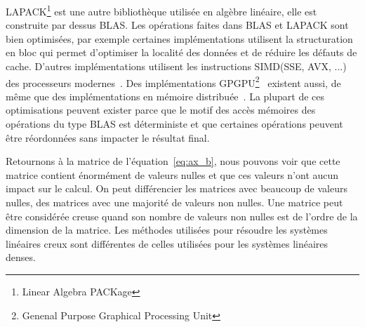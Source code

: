 LAPACK\footnote{Linear Algebra PACKage} est une autre bibliothèque utilisée en algèbre linéaire, elle est construite par dessus BLAS.
%
Les opérations faites dans BLAS et LAPACK sont bien optimisées, par exemple certaines implémentations utilisent la structuration en bloc qui permet d'optimiser la localité des données et de réduire les défauts de cache.
%
D'autres implémentations utilisent les instructions SIMD(SSE, AVX, ...) des processeurs modernes~\cite{intel_mkl}.
%
Des implémentations GPGPU\footnote{Genenal Purpose Graphical Processing Unit}~\cite{nvidia_cublas} existent aussi, de même que des implémentations en mémoire distribuée~\cite{dplasma}.
%
La plupart de ces optimisations peuvent exister parce que le motif des accès mémoires des opérations du type BLAS est déterministe et que certaines opérations peuvent être réordonnées sans impacter le résultat final.


Retournons à la matrice de l'équation~\eqref{eq:ax_b}, nous pouvons voir que cette matrice contient énormément de valeurs nulles et que ces valeurs n'ont aucun impact sur le calcul.
%
On peut différencier les matrices avec beaucoup de valeurs nulles, des matrices avec une majorité de valeurs non nulles.
%
Une matrice peut être considérée creuse quand son nombre de valeurs non nulles est de l'ordre de la dimension de la matrice.
%
Les méthodes utilisées pour résoudre les systèmes linéaires creux sont différentes de celles utilisées pour les systèmes linéaires denses.
